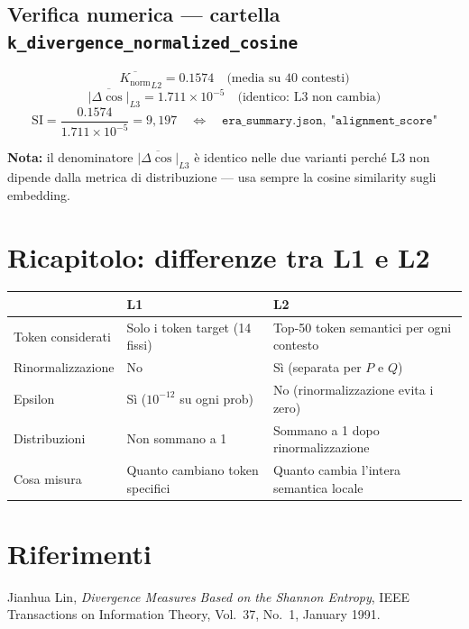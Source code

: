 \documentclass[12pt, a4paper]{article}
\begin{document}
\subsection{Verifica numerica — cartella \texttt{k\_divergence\_normalized\_cosine}}

\[
\overline{K_{\mathrm{norm}}}_{L2} = 0.1574 \quad \text{(media su 40 contesti)}
\]
\[
\overline{|\Delta\cos|}_{L3} = 1.711 \times 10^{-5} \quad \text{(identico: L3 non cambia)}
\]
\[
\mathrm{SI} = \frac{0.1574}{1.711 \times 10^{-5}} = 9{,}197 \quad \Longleftrightarrow \quad
\texttt{era\_summary.json},\ \texttt{"alignment\_score"}
\]

\noindent\textbf{Nota:} il denominatore $\overline{|\Delta\cos|}_{L3}$ è identico nelle due
varianti perché L3 non dipende dalla metrica di distribuzione — usa sempre la
cosine similarity sugli embedding.

\section{Ricapitolo: differenze tra L1 e L2}

\begin{center}
\begin{tabular}{lll}
\toprule
 & L1 & L2 \\
\midrule
Token considerati & Solo i token target (14 fissi) & Top-50 token semantici per ogni contesto \\
Rinormalizzazione & No & Sì (separata per $P$ e $Q$) \\
Epsilon & Sì ($10^{-12}$ su ogni prob) & No (rinormalizzazione evita i zero) \\
Distribuzioni & Non sommano a 1 & Sommano a 1 dopo rinormalizzazione \\
Cosa misura & Quanto cambiano token specifici & Quanto cambia l'intera semantica locale \\
\bottomrule
\end{tabular}
\end{center}

\section*{Riferimenti}

Jianhua Lin, \textit{Divergence Measures Based on the Shannon Entropy},
IEEE Transactions on Information Theory, Vol.\ 37, No.\ 1, January 1991.
\end{document}
